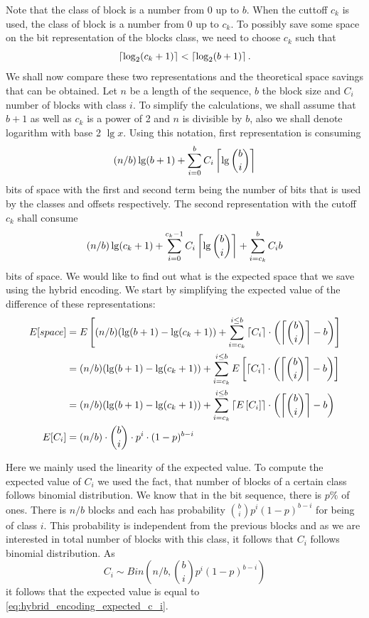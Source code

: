 Note that the class of block is a number from 0 up to $b$. When the cuttoff $c_k$ is
used, the class of block is a number from 0 up to $c_k$. To possibly save some space on the bit representation
of the blocks class, we need to choose $c_k$ such that $$\left\lceil \log_2(c_k+1) \right\rceil < \left\lceil \log_2(b+1) \right\rceil.$$
We shall now compare these two representations and the theoretical space savings that
can be obtained. Let $n$ be a length of the sequence, $b$ the block size and $C_i$
number of blocks with class $i$. To simplify the calculations, we shall assume that $b+1$
as well as $c_k$ is a power of 2 and $n$ is divisible by $b$, also we shall
denote logarithm with base 2 $\lg x$. Using this notation, first representation is
consuming $$(n/b)\lg (b+1) + \sum_{i=0}^{b} C_i\left\lceil \lg {b\choose i} \right\rceil$$
bits of space with the first and second term being the number of bits that
is used by the classes and offsets respectively. The second representation
with the cutoff $c_k$ shall consume $$(n/b)\lg (c_k+1) + \sum_{i=0}^{c_k-1}C_i\left\lceil \lg {b\choose i} \right\rceil + \sum_{i=c_k}^{b}C_i b$$
bits of space. We would like to find out what is the expected space that we save
using the hybrid encoding. We start by simplifying the expected value of the
difference of these representations:
\begin{align}
E[space] &= E\left[(n/b)(\lg(b+1)-\lg(c_k+1)) + \sum_{i=c_k}^{i\leq b}\left\lceil C_i \right\rceil\cdot \left(\left\lceil {b\choose i} \right\rceil - b\right)\right] \nonumber\\
&=(n/b)(\lg(b+1)-\lg(c_k+1)) + \sum_{i=c_k}^{i\leq b}E\left[\left\lceil C_i \right\rceil\cdot \left(\left\lceil {b\choose i} \right\rceil - b\right)\right] \nonumber\\
&=(n/b)(\lg(b+1)-\lg(c_k+1)) + \sum_{i=c_k}^{i\leq b}\left\lceil E\left[C_i\right] \right\rceil\cdot \left(\left\lceil {b\choose i} \right\rceil - b\right) \nonumber\\
E[C_i] &= (n/b)\cdot {b\choose i}\cdot p^i\cdot (1-p)^{b-i} \label{eq:hybrid_encoding_expected_c_i}
\end{align}

Here we mainly used the linearity of the expected value. To compute the expected value of
$C_i$ we used the fact, that number of blocks of a certain class follows binomial
distribution. We know that in the bit sequence, there is $p\%$ of ones. There is $n/b$ blocks
and each has probability ${b\choose i}p^i(1-p)^{b-i}$ for being of class $i$. This probability
is independent from the previous blocks and as we are interested in total number of blocks with
this class, it follows that $C_i$ follows binomial distribution. As
$$C_i \sim Bin(n/b, {b\choose i}p^i(1-p)^{b-i})$$ it follows that the expected value is equal to
\ref{eq:hybrid_encoding_expected_c_i}.

